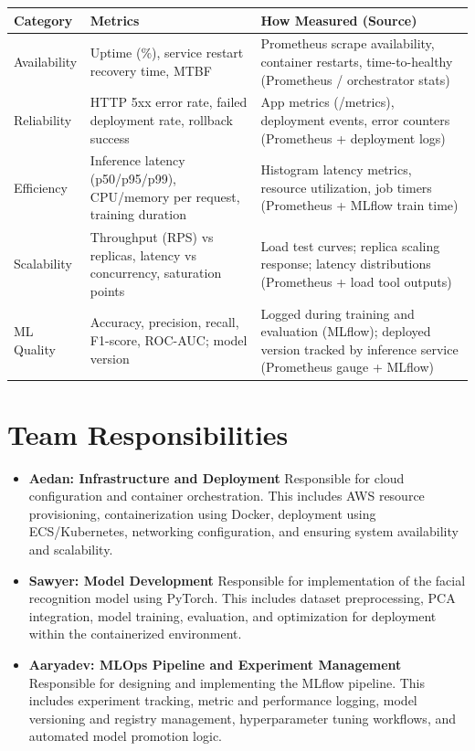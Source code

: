 \documentclass[10pt]{article}
\begin{document}
\begin{table}[h!]
\centering
\renewcommand{\arraystretch}{1.15}
\begin{tabular}{>{\RaggedRight\arraybackslash}p{3.1cm} >{\RaggedRight\arraybackslash}p{5.8cm} >{\RaggedRight\arraybackslash}p{5.2cm}}
\toprule
\textbf{Category} & \textbf{Metrics} & \textbf{How Measured (Source)} \\
\midrule
Availability &
Uptime (\%), service restart recovery time, MTBF &
Prometheus scrape availability, container restarts, time-to-healthy (Prometheus / orchestrator stats) \\
\midrule
Reliability &
HTTP 5xx error rate, failed deployment rate, rollback success &
App metrics (/metrics), deployment events, error counters (Prometheus + deployment logs) \\
\midrule
Efficiency &
Inference latency (p50/p95/p99), CPU/memory per request, training duration &
Histogram latency metrics, resource utilization, job timers (Prometheus + MLflow train time) \\
\midrule
Scalability &
Throughput (RPS) vs replicas, latency vs concurrency, saturation points &
Load test curves; replica scaling response; latency distributions (Prometheus + load tool outputs) \\
\midrule
ML Quality &
Accuracy, precision, recall, F1-score, ROC-AUC; model version &
Logged during training and evaluation (MLflow); deployed version tracked by inference service (Prometheus gauge + MLflow) \\
\bottomrule
\end{tabular}
\end{table}
\section*{Team Responsibilities}

\begin{itemize}[leftmargin=*]

\item \textbf{Aedan: Infrastructure and Deployment}
Responsible for cloud configuration and container orchestration. This includes AWS resource provisioning, containerization using Docker, deployment using ECS/Kubernetes, networking configuration, and ensuring system availability and scalability.

\item \textbf{Sawyer: Model Development}
Responsible for implementation of the facial recognition model using PyTorch. This includes dataset preprocessing, PCA integration, model training, evaluation, and optimization for deployment within the containerized environment.

\item \textbf{Aaryadev: MLOps Pipeline and Experiment Management}
Responsible for designing and implementing the MLflow pipeline. This includes experiment tracking, metric and performance logging, model versioning and registry management, hyperparameter tuning workflows, and automated model promotion logic.

\end{itemize}
\end{document}
